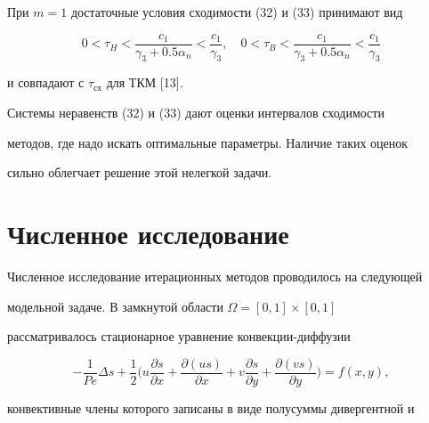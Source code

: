  


\begin{note} 


При $m=1$ достаточные условия сходимости (32) и (33) принимают вид 


$$ 


0<\tau_H<\frac{c_1}{\gamma_3+0.5\alpha_n}<\frac{c_1}{\gamma_3},\quad 


0<\tau_B<\frac{c_1}{\gamma_3+0.5\alpha_n}<\frac{c_1}{\gamma_3} 


$$ 


и совпадают с $\tau_{\text{сх}}$ \tts{!!} для ТКМ [13]. 


\end{note} 


 


\begin{note} 


Системы неравенств (32) и (33) дают оценки интервалов сходимости 


методов, где надо искать оптимальные параметры. Наличие таких оценок 


сильно облегчает решение этой нелегкой задачи. 


\end{note} 


 


\section{Численное исследование} 


 


Численное исследование итерационных методов проводилось на следующей 


модельной задаче. В замкнутой области $\Omega=[0,1]\times[0,1]$ 


рассматривалось стационарное уравнение конвекции-диффузии 


$$ 


-\frac{1}{Pe}\Delta s+\frac{1}{2}\bigg( 


u\frac{\partial s}{\partial x}+ 


\frac{\partial(us)}{\partial x}+v 


\frac{\partial s}{\partial y}+ 


\frac{\partial(v s)}{\partial y}\bigg)=f(x,y), 


$$ 


конвективные члены которого записаны в виде полусуммы дивергентной и 


